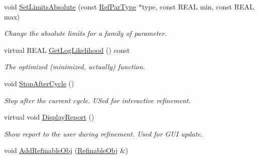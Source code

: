 \begin{DoxyCompactItemize}
\mbox{\label{class_obj_cryst_1_1_optimization_obj_ade59b2e1d698ff7ba93ac5aa88187c58}} 
void \mbox{\hyperlink{class_obj_cryst_1_1_optimization_obj_ade59b2e1d698ff7ba93ac5aa88187c58}{Set\+Limits\+Absolute}} (const \mbox{\hyperlink{class_obj_cryst_1_1_ref_par_type}{Ref\+Par\+Type}} $\ast$type, const R\+E\+AL min, const R\+E\+AL max)
\begin{DoxyCompactList}\small\item\em Change the absolute limits for a family of parameter. \end{DoxyCompactList}\item 
virtual R\+E\+AL \mbox{\hyperlink{class_obj_cryst_1_1_optimization_obj_a3850c776ec9ede5102caf7c0aa04e558}{Get\+Log\+Likelihood}} () const
\begin{DoxyCompactList}\small\item\em The optimized (minimized, actually) function. \end{DoxyCompactList}\item 
\mbox{\label{class_obj_cryst_1_1_optimization_obj_a288306acc3189c4fcaca398d11b32e4e}} 
void \mbox{\hyperlink{class_obj_cryst_1_1_optimization_obj_a288306acc3189c4fcaca398d11b32e4e}{Stop\+After\+Cycle}} ()
\begin{DoxyCompactList}\small\item\em Stop after the current cycle. U\+Sed for interactive refinement. \end{DoxyCompactList}\item 
\mbox{\label{class_obj_cryst_1_1_optimization_obj_a5fc008790222ef2beac49674e678d91d}} 
virtual void \mbox{\hyperlink{class_obj_cryst_1_1_optimization_obj_a5fc008790222ef2beac49674e678d91d}{Display\+Report}} ()
\begin{DoxyCompactList}\small\item\em Show report to the user during refinement. Used for G\+UI update. \end{DoxyCompactList}\item 
\mbox{\label{class_obj_cryst_1_1_optimization_obj_a05e7019188763202126f9f83a31e1673}} 
void \mbox{\hyperlink{class_obj_cryst_1_1_optimization_obj_a05e7019188763202126f9f83a31e1673}{Add\+Refinable\+Obj}} (\mbox{\hyperlink{class_obj_cryst_1_1_refinable_obj}{Refinable\+Obj}} \&)

\end{DoxyCompactItemize}
